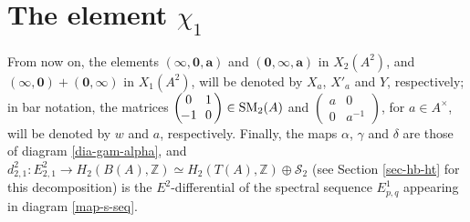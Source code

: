 \documentclass[11pt]{amsart}
\theoremstyle{definition}
\theoremstyle{plain}
\numberwithin{equation}{section}
\newcommand{\z}{\mathbb{Z}}
\renewcommand{\SS}{\mathcal{S}}
\renewcommand{\aa}{{A^\times}}
\newcommand{\SM}{\mathit{{\rm SM}}}
\newcommand{\mtxx}[4]
{\left(\!\!
\begin{array}{cc}
\!\!#1 & \!\!#2\\
\!\!#3 & \!\!#4
\end{array}\!\!
\right)}
\begin{document}
\section{The element \texorpdfstring{$\chi_1$}{X1}}
From now on, the elements $(\pmb{\infty},\pmb{0},\pmb{a})$ and $(\pmb{0},\pmb{\infty},\pmb{a})$ in $X_2(A^2)$, and $(\pmb{\infty},\pmb{0})+(\pmb{0},\pmb{\infty})$ in $X_1(A^2)$, will be denoted by $X_a$, $X'_a$ and $Y$, respectively; in bar notation, the matrices $\mtxx{0}{1}{-1}{0}\in\SM_2(A)$ and $\mtxx{a}{0}{0}{a^{-1}}$, for $a\in\aa$, will be denoted by $w$ and $a$, respectively. Finally, the maps $\alpha$, $\gamma$ and $\delta$ are those of diagram \eqref{dia-gam-alpha}, and $d^2_{2,1}:E^2_{2,1}\to H_2(B(A),\z)\simeq H_2(T(A),\z)\oplus\SS_2$ (see Section \ref{sec-hb-ht} for this decomposition) is the $E^2$-differential of the spectral sequence $E^1_{p,q}$ appearing in diagram \eqref{map-s-seq}. 
\end{document}
